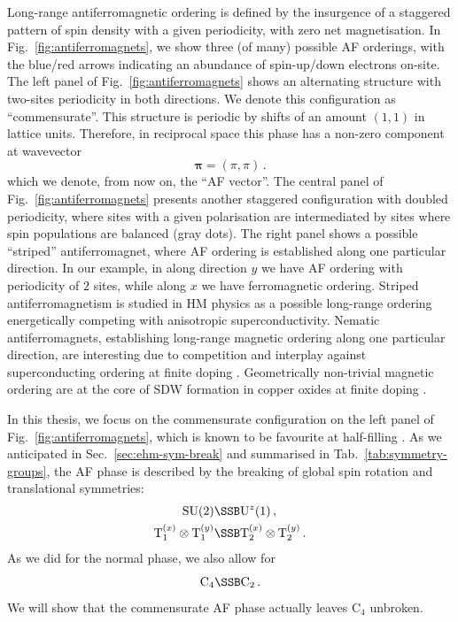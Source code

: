 Long-range antiferromagnetic ordering is defined by the insurgence of a staggered pattern of spin density with a given periodicity, with zero net magnetisation. In Fig.~\ref{fig:antiferromagnets}, we show three (of many) possible AF orderings, with the blue/red arrows indicating an abundance of spin-up/down electrons on-site.
The left panel of Fig.~\ref{fig:antiferromagnets} shows an alternating structure with two-sites periodicity in both directions. We denote this configuration as ``commensurate''. This structure is periodic by shifts of an amount $(1,1)$ in lattice units. Therefore, in reciprocal space this phase has a non-zero component at wavevector
\begin{equation}\label{eq:af-pi}
	\bm{\pi} = (\pi,\pi) \, .
\end{equation}
which we denote, from now on, the ``AF vector''.
The central panel of Fig.~\ref{fig:antiferromagnets} presents another staggered configuration with doubled periodicity, where sites with a given polarisation are intermediated by sites where spin populations are balanced (gray dots). The right panel shows a possible ``striped'' antiferromagnet, where AF ordering is established along one particular direction. In our example, in along direction $y$ we have AF ordering with periodicity of $2$ sites, while along $x$ we have ferromagnetic ordering. Striped antiferromagnetism is studied in HM physics \cite{wietek2021stripes} as a possible long-range ordering energetically competing with anisotropic superconductivity. Nematic antiferromagnets, establishing long-range magnetic ordering along one particular direction, are interesting due to competition and interplay against superconducting ordering at finite doping \cite{qin2020absence}. Geometrically non-trivial magnetic ordering are at the core of SDW formation in copper oxides at finite doping \cite{zaanen1989charged,kato1990soliton}.

In this thesis, we focus on the commensurate configuration on the left panel of Fig.~\ref{fig:antiferromagnets}, which is known to be favourite at half-filling \cite{keimer2015quantum}. As we anticipated in Sec.~\ref{sec:ehm-sym-break} and summarised in Tab.~\ref{tab:symmetry-groups}, the AF phase is described by the breaking of global spin rotation and translational symmetries:
\[
\begin{aligned}
	\mathrm{SU}(2) &\SSB \mathrm{U}^z(1) \, , \\
	\mathrm{T}_1^{(x)} \otimes \mathrm{T}_1^{(y)} &\SSB \mathrm{T}_2^{(x)} \otimes \mathrm{T}_2^{(y)} \, .
\end{aligned}
\]
As we did for the normal phase, we also allow for
\[
\mathrm{C}_4 \SSB \mathrm{C}_2 \, .
\]
We will show that the commensurate AF phase actually leaves $\mathrm{C}_4$ unbroken.

